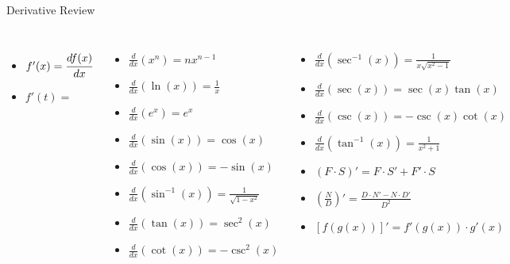 \documentclass[aspectratio=169,xcolor=dvipsnames,svgnames,x11names,fleqn]{beamer}
\begin{document}
\begin{frame}{Derivative Review}
 \begin{columns}
\begin{itemize}
        
    \item $f'(x) = \cfrac{d f(x)}{dx}$
    \item $f'(t) = $
\end{itemize}

\begin{itemize}
    \item $\frac{d}{dx}(x^n) = nx^{n-1}$
    \item $\frac{d}{dx}(\ln(x)) = \frac{1}{x}$
    \item $\frac{d}{dx}(e^x) = e^x$
    \item $\frac{d}{dx}(\sin(x)) = \cos(x)$
    \item $\frac{d}{dx}(\cos(x)) = -\sin(x)$
    \item $\frac{d}{dx}(\sin^{-1}(x)) = \frac{1}{\sqrt{1 - x^2}}$
    \item $\frac{d}{dx}(\tan(x)) = \sec^2(x)$
    \item $\frac{d}{dx}(\cot(x)) = -\csc^2(x)$
    \end{itemize}


\begin{itemize}
\item $\frac{d}{dx}(\sec^{-1}(x)) = \frac{1}{x\sqrt{x^2 - 1}}$
    \item $\frac{d}{dx}(\sec(x)) = \sec(x) \tan(x)$
    \item $\frac{d}{dx}(\csc(x)) = -\csc(x) \cot(x)$
    \item $\frac{d}{dx}(\tan^{-1}(x)) = \frac{1}{x^2 + 1}$
    \item $(F \cdot S)' = F \cdot S' + F' \cdot S$
    \item $\left(\frac{N}{D}\right)' = \frac{D \cdot N' - N \cdot D'}{D^2}$
    \item $[f(g(x))]' = f'(g(x)) \cdot g'(x)$
\end{itemize}
\end{columns}
\end{frame}
\end{document}
